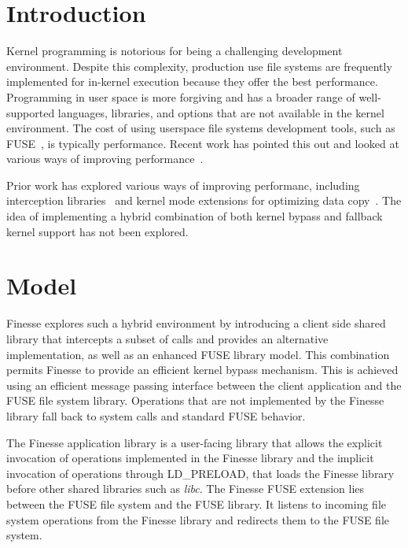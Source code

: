 \documentclass[sigplan,10pt,letter,plain]{acmart}
\begin{document}

\section{Introduction}

Kernel programming is notorious for being a challenging development environment.  Despite this complexity, production use file systems are frequently implemented for in-kernel execution because they offer the best performance.  Programming in user space is more forgiving and has a broader range of well-supported languages, libraries, and options that are not available in the kernel environment. The cost of using userspace file systems development tools, such as FUSE~\cite{fusegithub}, is typically performance.  Recent work has pointed this out and looked at various ways of improving performance~\cite{vangoor2017fuse,10.1145/3341301.3359637}.

Prior work has explored various ways of improving performanc, including interception libraries~\cite{wright2012ldplfs} and kernel mode extensions for optimizing data copy~\cite{234870}.  The idea of implementing a hybrid combination of both kernel bypass and fallback kernel support has not been explored.

\section{Model}

Finesse explores such a hybrid environment by introducing a client side shared library that intercepts a subset of calls and provides an alternative implementation, as well as an enhanced FUSE library model.  This combination permits Finesse to provide an efficient kernel bypass mechanism.  This is achieved using an efficient message passing interface between the client application and the FUSE file system library.  Operations that are not implemented by the Finesse library fall back to system calls and standard FUSE behavior.

The Finesse application library is a user-facing library that allows the explicit invocation of operations implemented in the Finesse library and the implicit invocation of operations through LD\_PRELOAD, that loads the Finesse library before other shared libraries such as \textit{libc}. The Finesse FUSE extension lies between the FUSE file system and the FUSE library.   It listens to incoming file system operations from the Finesse library and redirects them to the FUSE file system.
\end{document}
